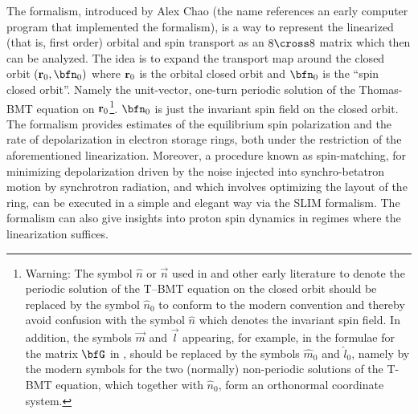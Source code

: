 {The  formalism\cite{b:chao.spin,b:barber99}, introduced by Alex Chao (the name references
an early computer program that implemented the formalism), is a way to represent the linearized
(that is, first order) orbital and spin transport as an $8 \cross 8$ matrix which then can be
analyzed. The idea is to expand the transport map around the closed orbit $(\bfr_0, \bfn_0)$ where
${\bf r}_0$ is the orbital closed orbit and $\bfn_0$ is the ``spin closed orbit''. Namely the
unit-vector, one-turn periodic solution of the Thomas-BMT equation on ${\bf r}_0$\footnote
  {
Warning: The symbol $\hat n$ or
$\vec n$ used in \cite{b:chao.spin,b:barber85} and other early literature to denote the periodic
solution of the T--BMT equation on the closed orbit should be replaced by the symbol $\hat n_0$ to
conform to the modern convention \cite{b:barber99} and thereby avoid confusion with the symbol $\hat
n$ which denotes the invariant spin field.  In addition, the symbols $\vec m$ and $\vec l$
appearing, for example, in the formulae for the matrix $\bfG$ in \cite{b:barber85}, should be
replaced by the symbols $\hat m_0$ and $\hat l_0$, namely by the modern symbols for the two
(normally) non-periodic solutions of the T-BMT equation, which together with $\hat n_0$, form an
orthonormal coordinate system.
  }.
% 
$\bfn_0$ is just the invariant spin field on the closed orbit. The formalism provides estimates of
the equilibrium spin polarization and the rate of depolarization in electron storage rings, both
under the restriction of the aforementioned linearization. Moreover, a procedure known as
spin-matching, for minimizing depolarization driven by the noise injected into synchro-betatron
motion by synchrotron radiation, and which involves optimizing the layout of the ring, can be
executed in a simple and elegant way via the SLIM formalism. The formalism can also give insights
into proton spin dynamics in regimes where the linearization suffices.

}
